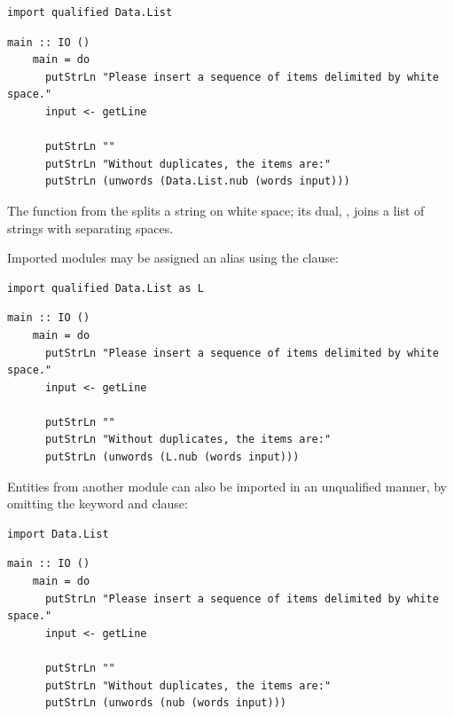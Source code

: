\documentclass[UdineBachThesis,american,11pt,draft]{PhdThesis}
\begin{document}
  \begin{lstlisting}[gobble=4,basicstyle=\ttfamily\small]
    import qualified Data.List
  \end{lstlisting}

  \begin{lstlisting}[gobble=4,basicstyle=\ttfamily\small]
    main :: IO ()
    main = do
      putStrLn "Please insert a sequence of items delimited by white space."
      input <- getLine

      putStrLn ""
      putStrLn "Without duplicates, the items are:"
      putStrLn (unwords (Data.List.nub (words input)))
  \end{lstlisting}

  The function \lstinline@words@ from the \lstinline@Prelude@ splits a string on
  white space; its dual, \lstinline@unwords@, joins a list of strings with
  separating spaces.

  Imported modules may be assigned an alias using the \lstinline@as@ clause:

  \begin{lstlisting}[gobble=4,basicstyle=\ttfamily\small]
    import qualified Data.List as L
  \end{lstlisting}

  \begin{lstlisting}[gobble=4,basicstyle=\ttfamily\small]
    main :: IO ()
    main = do
      putStrLn "Please insert a sequence of items delimited by white space."
      input <- getLine

      putStrLn ""
      putStrLn "Without duplicates, the items are:"
      putStrLn (unwords (L.nub (words input)))
  \end{lstlisting}

  Entities from another module can also be imported in an unqualified manner,
  by omitting the \lstinline@qualified@ keyword and \lstinline@as@ clause:

  \begin{lstlisting}[gobble=4,basicstyle=\ttfamily\small]
    import Data.List
  \end{lstlisting}

  \begin{lstlisting}[gobble=4,basicstyle=\ttfamily\small]
    main :: IO ()
    main = do
      putStrLn "Please insert a sequence of items delimited by white space."
      input <- getLine

      putStrLn ""
      putStrLn "Without duplicates, the items are:"
      putStrLn (unwords (nub (words input)))
  \end{lstlisting}
\end{document}
